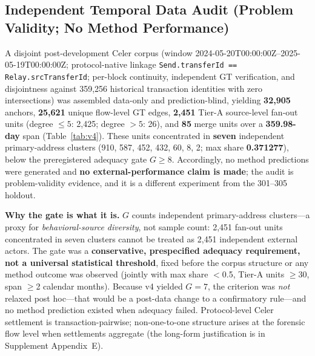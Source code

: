 \subsection{Independent Temporal Data Audit (Problem Validity; No Method Performance)}
\label{sec:v4audit}

A disjoint post-development Celer corpus (window 2024-05-20T00:00:00Z--2025-05-19T00:00:00Z; protocol-native linkage \texttt{Send.transferId == Relay.srcTransferId}; per-block continuity, independent GT verification, and disjointness against 359{,}256 historical transaction identities with zero intersections) was assembled data-only and prediction-blind, yielding \textbf{32{,}905} anchors, \textbf{25{,}621} unique flow-level GT edges, \textbf{2{,}451} Tier-A source-level fan-out units (degree $\le 5$: 2{,}425; degree $> 5$: 26), and \textbf{85} merge units over a \textbf{359.98-day} span (Table~\ref{tab:v4}). These units concentrated in \textbf{seven} independent primary-address clusters (910, 587, 452, 432, 60, 8, 2; max share \textbf{0.371277}), below the preregistered adequacy gate $G\ge 8$. Accordingly, no method predictions were generated and \textbf{no external-performance claim is made}; the audit is problem-validity evidence, and it is a different experiment from the 301--305 holdout.

\textbf{Why the gate is what it is.} $G$ counts independent primary-address clusters---a proxy for \emph{behavioral-source diversity}, not sample count: 2{,}451 fan-out units concentrated in seven clusters cannot be treated as 2{,}451 independent external actors. The gate was a \textbf{conservative, prespecified adequacy requirement, not a universal statistical threshold}, fixed before the corpus structure or any method outcome was observed (jointly with max share $<$0.5, Tier-A units $\ge$30, span $\ge$2 calendar months). Because v4 yielded $G=7$, the criterion was \emph{not} relaxed post hoc---that would be a post-data change to a confirmatory rule---and no method prediction existed when adequacy failed. Protocol-level Celer settlement is transaction-pairwise; non-one-to-one structure arises at the forensic flow level when settlements aggregate (the long-form justification is in Supplement Appendix~E).

